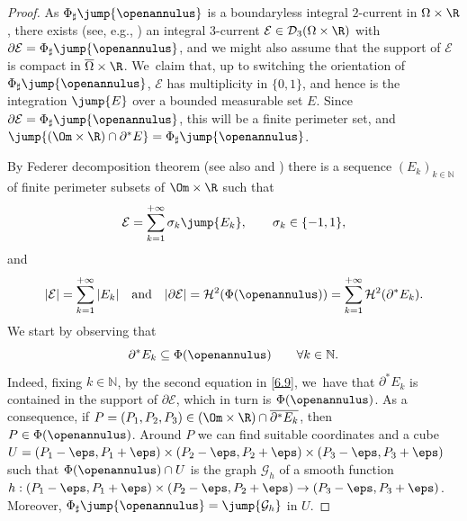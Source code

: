 \begin{proof}
As $\Phi_\sharp\jump{\openannulus}$ is a boundaryless integral $2$-current in $\Omega\times\R$, there exists (see, e.g., \cite[Th.\,7.9.1]{Krantz-Parks}) an integral $3$-current $\mathcal E\in \mathcal D_3(\Omega\times\R)$ with $\partial\mathcal E=\Phi_\sharp\jump{\openannulus}$, and we might also assume that the support of $\mathcal E$ is compact in $\overline\Omega\times\R$. We~claim that, up to switching the orientation of $\Phi_\sharp\jump{\openannulus}$, $\mathcal E$ has multiplicity in $\{0,1\}$, and hence is the integration $\jump{E}$ over a bounded measurable set $E$.
Since $\partial\mathcal E=\Phi_\sharp\jump{\openannulus}$, this will be a
finite perimeter set, and $\jump{(\Om\times\R)\cap\partial^*E}=\Phi_\sharp\jump{\openannulus}$.

By Federer decomposition theorem \cite[\S 4.2.25, p.\,420]{Federer} (see also \cite[\S 4.5.9]{Federer} and \cite[Th.\,7.5.5]{Krantz-Parks}) there is a sequence
$(E_k)_{k\in \mathbb N}$ of finite perimeter subsets of $\Om\times\R$ such that
\begin{equation}\label{6.9a}
\mathcal E=\sum_{k=1}^{+\infty}\sigma_k\jump{E_k},\qquad \sigma_k\in \{-1,1\},
\end{equation}
and
\begin{align}\label{6.9}
|\mathcal E|=\sum_{k=1}^{+\infty}|E_k|\quad\text{and} \quad|\partial\mathcal E|=\mathcal H^2(\Phi(\openannulus))=\sum_{k=1}^{+\infty}\mathcal H^2(\partial^*E_k).
\end{align}
We start by observing that
\begin{equation}\label{inclusione}
\partial^*E_k\subseteq \Phi(\openannulus)\qquad \forall k\in \mathbb N.
\end{equation}
Indeed, fixing $k\in \mathbb N$, by the second equation in \eqref{6.9}, we~have that $\partial^*E_k$ is contained in the support of $\partial\mathcal E$, which in turn is $\Phi(\openannulus)$.
As a consequence, if $P=(P_1,P_2,P_3)\in(\Om\times\R)\cap \overline{\partial^*E_k}$, then $P\in \Phi(\openannulus)$. Around $P$ we can find suitable coordinates and a cube $U=(P_1-\eps,P_1+\eps)\times (P_2-\eps,P_2+\eps)\times(P_3-\eps,P_3+\eps)$ such that $\Phi(\openannulus)\cap U$ is the graph $\mathcal G_h$ of a smooth function $h:(P_1-\eps,P_1+\eps)\times (P_2-\eps,P_2+\eps)\to (P_3-\eps,P_3+\eps)$. Moreover, $\Phi_\sharp\jump{\openannulus}=\jump{\mathcal G_h}$ in $U$.


\end{proof}
